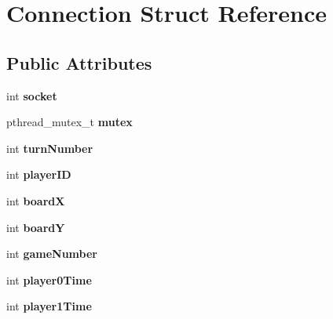 \hypertarget{structConnection}{
\section{Connection Struct Reference}
\label{structConnection}
}
\subsection*{Public Attributes}
\begin{DoxyCompactItemize}
\item 
\hypertarget{structConnection_afeebe9a1ebc19966d58faa5eca7ad36d}{
int {\bfseries socket}}
\label{structConnection_afeebe9a1ebc19966d58faa5eca7ad36d}

\item 
\hypertarget{structConnection_a7b27ff790f8a42a54c76ef4d163d7e57}{
pthread\_\-mutex\_\-t {\bfseries mutex}}
\label{structConnection_a7b27ff790f8a42a54c76ef4d163d7e57}

\item 
\hypertarget{structConnection_ae1f13fe61a2400a6a1cc9322f25d286b}{
int {\bfseries turnNumber}}
\label{structConnection_ae1f13fe61a2400a6a1cc9322f25d286b}

\item 
\hypertarget{structConnection_a8054101484b1635e9e2888390fc7e82d}{
int {\bfseries playerID}}
\label{structConnection_a8054101484b1635e9e2888390fc7e82d}

\item 
\hypertarget{structConnection_a915028dcc52b6cd72678fed892bf0834}{
int {\bfseries boardX}}
\label{structConnection_a915028dcc52b6cd72678fed892bf0834}

\item 
\hypertarget{structConnection_aca78001bac4a1d2433ee5f65ba1260d8}{
int {\bfseries boardY}}
\label{structConnection_aca78001bac4a1d2433ee5f65ba1260d8}

\item 
\hypertarget{structConnection_a33a204e9624fbd7b0a77347a15ec0f10}{
int {\bfseries gameNumber}}
\label{structConnection_a33a204e9624fbd7b0a77347a15ec0f10}

\item 
\hypertarget{structConnection_a214b3530af5b40ec1abd7b6817770a3e}{
int {\bfseries player0Time}}
\label{structConnection_a214b3530af5b40ec1abd7b6817770a3e}

\item 
\hypertarget{structConnection_a0adf2a815f73e16206d911f63caededa}{
int {\bfseries player1Time}}
\label{structConnection_a0adf2a815f73e16206d911f63caededa}


\end{DoxyCompactItemize}
